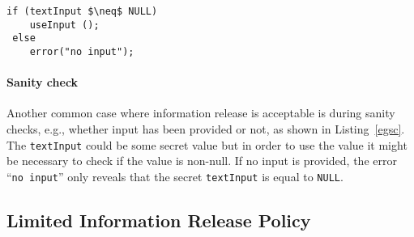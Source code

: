 \begin{lstlisting}[float,caption=Sanity Check,label=egsc]
 if (textInput $\neq$ NULL)
    useInput ();
 else
    error("no input");
\end{lstlisting}
\paragraph{Sanity check}
Another common case where information release is acceptable is during
sanity checks, e.g., whether input has been provided or not, as shown in
Listing~\ref{egsc}. The \texttt{textInput} could be some secret value
but in order to use the value it might be necessary to check if the value is
non-null. If no input is
provided, the error ``\texttt{no input}'' only reveals that the
secret \texttt{textInput} is equal to \texttt{NULL}.


\subsection{Limited Information Release Policy}
\label{sec:lir-policy}

